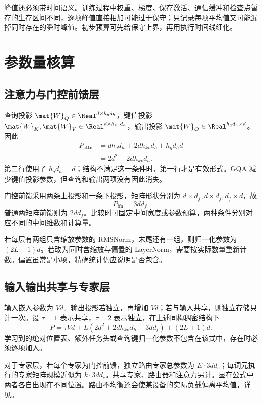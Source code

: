 \documentclass[../textbook.tex]{subfiles}
\begin{document}
峰值还必须带时间语义。训练过程中权重、梯度、保存激活、通信缓冲和检查点暂存的生存区间不同，逐项峰值直接相加可能过于保守；只记录每项平均值又可能漏掉同时存在的瞬时峰值。初步预算可先给保守上界，再用执行时间线细化。

\section{参数量核算}

\subsection{注意力与门控前馈层}
查询投影 $\mat{W}_Q\in\Real^{d\times h_qd_h}$，键值投影 $\mat{W}_K,\mat{W}_V\in\Real^{d\times h_{kv}d_h}$，输出投影 $\mat{W}_O\in\Real^{h_qd_h\times d}$。因此
\begin{align}
 P_{\mathrm{attn}}
 &=d h_qd_h+2d h_{kv}d_h+h_qd_hd\\
 &=2d^2+2d h_{kv}d_h.\label{eq:budget-attn-params}
\end{align}
第二行使用了 $h_qd_h=d$；结构不满足这一条件时，第一行才是有效形式。GQA 减少键值投影参数，但查询和输出两项没有因此消失。

门控前馈采用两条上投影和一条下投影，矩阵形状分别为 $d\times d_f,d\times d_f,d_f\times d$，故
\begin{equation}
 P_{\mathrm{ffn}}=3dd_f.
\end{equation}
普通两矩阵前馈则为 $2dd_f$。比较时可固定中间宽度或参数预算，两种条件分别对应不同的中间维数和计算量。

若每层有两组只含缩放参数的 RMSNorm，末尾还有一组，则归一化参数为 $(2L+1)d$。若改为同时含缩放与偏置的 LayerNorm，需要按实际数量重新计数。偏置虽常是小项，精确统计仍应说明是否包含。

\subsection{输入输出共享与专家层}
输入嵌入参数为 $Vd$。输出投影若独立，再增加 $Vd$；若与输入共享，则独立存储只计一次。设 $\tau=1$ 表示共享，$\tau=2$ 表示独立，在上述同构稠密结构下
\begin{equation}\label{eq:budget-totalparams}
 P=\tau Vd+L(2d^2+2dh_{kv}d_h+3dd_f)+(2L+1)d.
\end{equation}
学习到的绝对位置表、额外任务头或查询键归一化参数不包含在该式中，存在时必须逐项加入。

对于专家层，若每个专家为门控前馈，独立路由专家总参数为 $E\cdot3dd_e$；每词元执行的专家矩阵规模近似为 $k\cdot3dd_e$。共享专家、路由器和注意力另计。显存公式中两者各自出现在不同位置。路由不均衡还会使某设备的实际负载偏离平均值，详见。
\end{document}
